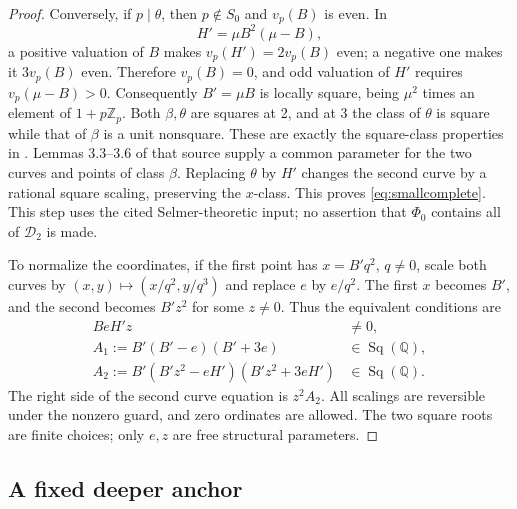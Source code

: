 \documentclass[11pt,reqno]{amsart}
\theoremstyle{definition}
\numberwithin{equation}{section}
\newcommand{\Q}{\mathbb Q}
\newcommand{\Z}{\mathbb Z}
\newcommand{\Sq}{\operatorname{Sq}}
\begin{document}
\begin{proof}
Conversely, if $p\mid\theta$, then $p\notin S_0$ and $v_p(B)$ is even. In
\[
 H'=\mu B^2(\mu-B),
\]
a positive valuation of $B$ makes $v_p(H')=2v_p(B)$ even; a negative one makes it $3v_p(B)$ even. Therefore $v_p(B)=0$, and odd valuation of $H'$ requires $v_p(\mu-B)>0$. Consequently $B'=\mu B$ is locally square, being $\mu^2$ times an element of $1+p\Z_p$. Both $\beta,\theta$ are squares at 2, and at 3 the class of $\theta$ is square while that of $\beta$ is a unit nonsquare. These are exactly the square-class properties in \cite[Lemma 3.2]{OAI}. Lemmas 3.3--3.6 of that source supply a common parameter for the two curves and points of class $\beta$. Replacing $\theta$ by $H'$ changes the second curve by a rational square scaling, preserving the $x$-class. This proves \eqref{eq:smallcomplete}. This step uses the cited Selmer-theoretic input; no assertion that $\Phi_0$ contains all of $\mathcal D_2$ is made.

To normalize the coordinates, if the first point has $x=B'q^2$, $q\ne0$, scale both curves by $(x,y)\mapsto(x/q^2,y/q^3)$ and replace $e$ by $e/q^2$. The first $x$ becomes $B'$, and the second becomes $B'z^2$ for some $z\ne0$. Thus the equivalent conditions are
\begin{align}
 BeH'z&\ne0,\label{eq:phinonzero}\\
 A_1:=B'(B'-e)(B'+3e)&\in\Sq(\Q),\label{eq:phisquareone}\\
 A_2:=B'(B'z^2-eH')(B'z^2+3eH')&\in\Sq(\Q).\label{eq:phisquaretwo}
\end{align}
The right side of the second curve equation is $z^2A_2$. All scalings are reversible under the nonzero guard, and zero ordinates are allowed. The two square roots are finite choices; only $e,z$ are free structural parameters.
\end{proof}

\subsection{A fixed deeper anchor}
\end{document}
